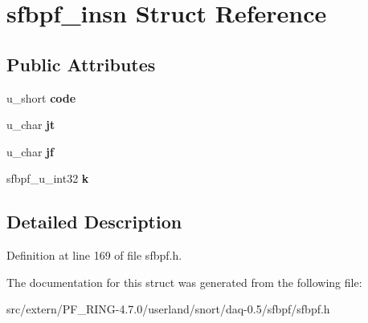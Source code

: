 \hypertarget{structsfbpf__insn}{
\section{sfbpf\_\-insn Struct Reference}
\label{structsfbpf__insn}
}
\subsection*{Public Attributes}
\begin{DoxyCompactItemize}
\item 
\hypertarget{structsfbpf__insn_ac6e85532d47c7b21309e2d0c726f0eb4}{
u\_\-short {\bfseries code}}
\label{structsfbpf__insn_ac6e85532d47c7b21309e2d0c726f0eb4}

\item 
\hypertarget{structsfbpf__insn_a847fb81f071b61c44c19bc9baf7f0ccd}{
u\_\-char {\bfseries jt}}
\label{structsfbpf__insn_a847fb81f071b61c44c19bc9baf7f0ccd}

\item 
\hypertarget{structsfbpf__insn_a95a4b11cbdc66b3ae8cedfdf2fe7e014}{
u\_\-char {\bfseries jf}}
\label{structsfbpf__insn_a95a4b11cbdc66b3ae8cedfdf2fe7e014}

\item 
\hypertarget{structsfbpf__insn_a328e4ee21bb3e8028da0d283c8a621d6}{
sfbpf\_\-u\_\-int32 {\bfseries k}}
\label{structsfbpf__insn_a328e4ee21bb3e8028da0d283c8a621d6}

\end{DoxyCompactItemize}


\subsection{Detailed Description}


Definition at line 169 of file sfbpf.h.



The documentation for this struct was generated from the following file:\begin{DoxyCompactItemize}
\item 
src/extern/PF\_\-RING-\/4.7.0/userland/snort/daq-\/0.5/sfbpf/sfbpf.h\end{DoxyCompactItemize}
